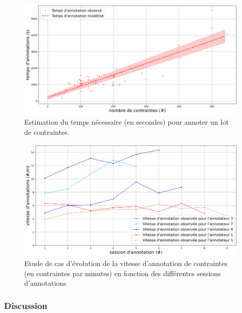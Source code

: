 			\begin{figure}[!htb]
				\centering
				\includegraphics[width=\textwidth]{figures/etude-temps-annotation-1-modelisation-temps}
				\caption{Estimation du temps nécessaire (en secondes) pour annoter un lot de contraintes.}
				\label{figure:4.3.2-ETUDE-COUTS-TEMPS-ANNOTATION-SIMULATION}
			\end{figure}
			
		
			\begin{figure}[!htb]
				\centering
				\includegraphics[width=\textwidth]{figures/etude-temps-annotation-3-etude-de-cas}
				\caption{Etude de cas d'évolution de la vitesse d'annotation de contraintes (en contraintes par minutes) en fonction des différentes sessions d'annotations}
				\label{figure:4.3.2-ETUDE-COUTS-TEMPS-ANNOTATION-EXEMPLE}
			\end{figure}

		\subsubsection{Discussion}
		
